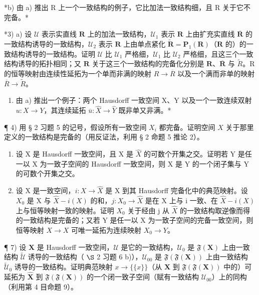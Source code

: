 *b) 由 a) 推出 R 上一个一致结构的例子，它比加法一致结构细，且 R 关于它不完备。*

*3) a) 设 \(\mathcal{U}\) 表示实直线 \(\mathbf{R}\) 上的加法一致结构，\(\mathcal{U}_1\) 表示 \(\mathbf{R}\) 上由扩充实直线 \(\overline{\mathbf{R}}\) 的一致结构诱导的一致结构，\(\mathcal{U}_2\) 表示 \(\mathbf{R}\) 上由单点紧化 \(\tilde{\mathbf{R}} = \mathbf{P}_1(\mathbf{R})\)（\(\mathbf{R}\) 的）的一致结构诱导的一致结构。证明 \(\mathcal{U}\) 比 \(\mathcal{U}_1\) 严格细，\(\mathcal{U}_1\) 比 \(\mathcal{U}_2\) 严格细，且这三个一致结构诱导的拓扑相同；又 \(\mathbf{R}\) 关于这三个一致结构的完备化分别是 \(\mathbf{R}\)、\(\overline{\mathbf{R}}\) 与 \(\tilde{R}\)。R 的恒等映射由连续性延拓为一个单而非满的映射 \(R \rightarrow \overline{R}\) 以及一个满而非单的映射 \(\overline{R} \rightarrow \tilde{R}\)。

\begin{enumerate}
\def\labelenumi{\alph{enumi})}
\setcounter{enumi}{1}
\tightlist
\item
  由 a) 推出一个例子：两个 Hausdorff 一致空间 X、Y 以及一个一致连续双射 \(u: X \rightarrow Y\)，其连续延拓 \(\overline{u}: \hat{X} \rightarrow \hat{Y}\) 既非单又非满。*
\end{enumerate}

¶ 4) 用 § 2 习题 5 的记号，假设所有一致空间 \(X_i\) 都完备。证明空间 \(X\) 关于那里定义的一致结构是完备的（用反证法，利用 § 2 命题 5 推论 2）。

\begin{enumerate}
\def\labelenumi{\arabic{enumi})}
\setcounter{enumi}{4}
\item
  设 X 是 Hausdorff 一致空间，且 X 是 \(\hat{X}\) 的可数个开集之交。证明若 Y 是任一以 X 为一致子空间的 Hausdorff 一致空间，则 X 是 Y 的一个闭子集与 Y 的可数个开集之交。
\item
  设 X 是一致空间，\(i: X \to \hat{X}\) 是 X 到其 Hausdorff 完备化中的典范映射。设 \(X_{0}\) 是 X 与 \(\hat{X} - i(X)\) 的和，\(j: X_{0} \to \hat{X}\) 是在 X 上与 i 一致、在 \(\hat{X} - i(X)\) 上与恒等映射一致的映射。证明 \(X_{0}\) 关于经由 j 从 \(\hat{X}\) 的一致结构取逆像而得的一致结构是完备的；又若 Y 是任一以 X 为一致子空间的完备一致空间，则恒等映射 \(X \to X\) 可唯一延拓为连续映射 \(X_{0} \to Y\)。
\end{enumerate}

¶ 7) 设 \(\mathbf{X}\) 是 Hausdorff 一致空间，\(\mathcal{U}\) 是它的一致结构，\(\mathcal{U}_0\) 是 \(\mathfrak{F}(\mathbf{X})\) 上由一致结构 \(\tilde{\mathcal{U}}\) 诱导的一致结构（ \(\S\) 2 习题 6 b)），\(\mathcal{U}_{00}\) 是 \(\mathfrak{F}(\mathfrak{F}(\mathbf{X}))\) 上由一致结构 \(\tilde{\mathcal{U}}_0\) 诱导的一致结构。证明典范映射 \(x \to \{\{x\}\}\)（从 \(\mathbf{X}\) 到 \(\mathfrak{F}(\mathfrak{F}(\mathbf{X}))\) 中的）可延拓为 \(\hat{\mathbf{X}}\) 到 \(\mathfrak{F}(\mathfrak{F}(\mathbf{X}))\) 的一个闭一致子空间（赋有一致结构 \(\mathcal{U}_{00}\)）上的同构（利用第 4 目命题 9）。

